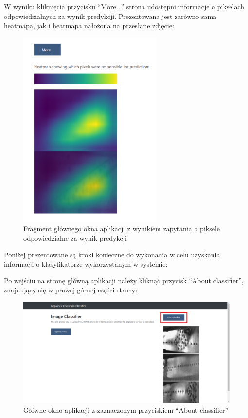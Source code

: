 \documentclass[polish,12pt]{aghthesis}
\begin{document}
\noindent W wyniku kliknięcia przycisku ``More...'' strona udostępni informacje o pikselach odpowiedzialnych za wynik predykcji. Prezentowana jest zarówno sama heatmapa, jak i heatmapa nałożona na przesłane zdjęcie:
\begin{figure}[H]%
\centering
\includegraphics[width=7.25cm]{images/heatmapaInstrUz.PNG}
\caption{Fragment głównego okna aplikacji z wynikiem zapytania o piksele odpowiedzialne za wynik predykcji}
\end{figure}

\par\noindent Poniżej prezentowane są kroki konieczne do wykonania w celu uzyskania informacji o klasyfikatorze wykorzystanym w systemie:

\noindent Po wejściu na stronę główną aplikacji należy kliknąć przycisk ``About classifier'', znajdujący się w prawej górnej części strony:
\begin{figure}[H]%
\centering
\includegraphics[width=14.75cm]{images/aboutClassifier.PNG}
\caption{Główne okno aplikacji z zaznaczonym przyciskiem ``About classifier''}
\end{figure}
\end{document}
